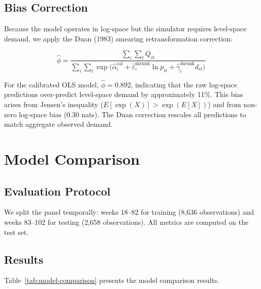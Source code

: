 \documentclass[12pt,a4paper]{article}
\begin{document}
\subsection{Bias Correction}

Because the model operates in log-space but the simulator requires
level-space demand, we apply the Duan (1983) smearing retransformation
correction:

\begin{equation}
\hat{\phi} = \frac{\sum_i \sum_t Q_{it}}
{\sum_i \sum_t \exp\bigl(\hat{\alpha}_i^{\text{cal}}
+ \hat{\varepsilon}_i^{\text{shrunk}} \ln p_{it}
+ \hat{\gamma}_i^{\text{shrunk}} d_{it}\bigr)}
\end{equation}

For the calibrated OLS model, $\hat{\phi} = 0.892$,
indicating that the raw log-space predictions over-predict
level-space demand by approximately 11\%. This bias arises from
Jensen's inequality ($E[\exp(X)] > \exp(E[X])$) and from
non-zero log-space bias (0.30 nats). The Duan correction
rescales all predictions to match aggregate observed demand.

\section{Model Comparison}
\label{sec:comparison}

\subsection{Evaluation Protocol}

We split the panel temporally: weeks 18--82 for training (8,636
observations) and weeks 83--102 for testing (2,658 observations).
All metrics are computed on the test set.

\subsection{Results}

Table~\ref{tab:model-comparison} presents the model comparison
results.
\end{document}
